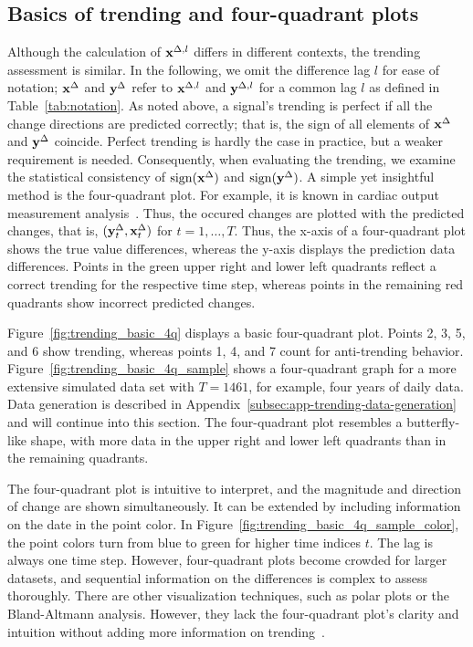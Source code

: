 \subsection{Basics of trending and four-quadrant plots}\label{subsec:trending-basics}

Although the calculation of $\mathbf{x}^{\Delta,l}$ differs in different contexts, the trending assessment is similar.
In the following, we omit the difference lag $l$ for ease of notation; $\mathbf{x}^{\Delta}$ and $\mathbf{y}^{\Delta}$ refer to $\mathbf{x}^{\Delta,l}$ and $\mathbf{y}^{\Delta,l}$ for a common lag $l$ as defined in Table~\ref{tab:notation}.
As noted above, a signal's trending is perfect if all the change directions are predicted correctly; that is, the sign of all elements of $\mathbf{x}^{\Delta}$ and $\mathbf{y}^{\Delta}$ coincide.
Perfect trending is hardly the case in practice, but a weaker requirement is needed.
Consequently, when evaluating the trending, we examine the statistical consistency of $\operatorname{sign}(\mathbf{x}^{\Delta})$ and $\operatorname{sign}(\mathbf{y}^{\Delta})$.
A simple yet insightful method is the four-quadrant plot.
For example, it is known in cardiac output measurement analysis~\parencite{Saugel2015,perrino1998intraoperative}. 
Thus, the occured changes are plotted with the predicted changes, that is, $(\mathbf{y}^{\Delta}_t, \mathbf{x}^{\Delta}_t)$ for $t = 1, \dots, T$.
Thus, the x-axis of a four-quadrant plot shows the true value differences, whereas the y-axis displays the prediction data differences.
Points in the green upper right and lower left quadrants reflect a correct trending for the respective time step, whereas points in the remaining red quadrants show incorrect predicted changes.

Figure~\ref{fig:trending_basic_4q} displays a basic four-quadrant plot.
Points 2, 3, 5, and 6 show trending, whereas points 1, 4, and 7 count for anti-trending behavior.
Figure~\ref{fig:trending_basic_4q_sample} shows a four-quadrant graph for a more extensive simulated data set with $T=1461$, for example, four years of daily data.
Data generation is described in Appendix~\ref{subsec:app-trending-data-generation} and will continue into this section.
The four-quadrant plot resembles a butterfly-like shape, with more data in the upper right and lower left quadrants than in the remaining quadrants.

The four-quadrant plot is intuitive to interpret, and the magnitude and direction of change are shown simultaneously.
It can be extended by including information on the date in the point color.
In Figure~\ref{fig:trending_basic_4q_sample_color}, the point colors turn from blue to green for higher time indices $t$.
The lag is always one time step.
However, four-quadrant plots become crowded for larger datasets, and sequential information on the differences is complex to assess thoroughly.
There are other visualization techniques, such as polar plots or the Bland-Altmann analysis.
However, they lack the four-quadrant plot's clarity and intuition without adding more information on trending~\parencite{Saugel2015}.

